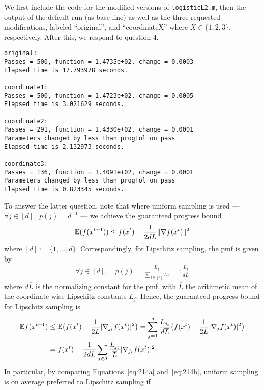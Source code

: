 \documentclass{article}
\begin{document}
We first include the code for the modified versions of \texttt{logisticL2.m},
then the output of the default run (as base-line) as well as the three
requested modifications, labeled ``original'', and ``coordinateX'' where
$X \in \{1,2,3\}$, respectively. After this, we respond to question 4.

\begin{verbatim}
original: 
Passes = 500, function = 1.4735e+02, change = 0.0003 
Elapsed time is 17.793978 seconds.

coordinate1: 
Passes = 500, function = 1.4723e+02, change = 0.0005 
Elapsed time is 3.021629 seconds.

coordinate2: 
Passes = 291, function = 1.4330e+02, change = 0.0001 
Parameters changed by less than progTol on pass 
Elapsed time is 2.132973 seconds.

coordinate3: 
Passes = 136, function = 1.4091e+02, change = 0.0001 
Parameters changed by less than progTol on pass 
Elapsed time is 0.823345 seconds.
\end{verbatim}
To answer the latter question, note that where uniform sampling is used ---
$\forall j \in [d], \,\, p(j) =
d^{-1}$ --- we achieve the guaranteed progress bound
\begin{align}
  \mathbb E (f(x^{t+1})) \leq f(x^t) - \frac{1}{2dL} \|\nabla f(x^t)\|^2 \label{eq:214a}
\end{align}
where $[d] := \{1, \ldots, d\}$. Correspondingly, for Lipschitz sampling, the
pmf is given by
\begin{align*}
\forall j \in [d],\quad p(j) = \frac{L_j}{\sum_{j \in [d]} L_j} =: \frac{L_j}{d \overline{L}}
\end{align*}
where $d\overline{L}$ is the normalizing constant for the pmf, with
$\overline{L}$ the arithmetic mean of the coordinate-wise Lipschitz constants
$L_j$. Hence, the guaranteed progress bound for Lipschitz sampling is
\begin{align}
  \E f(x^{t+1}) &\leq \E \big( f(x^t) - \frac{1}{2L} |\nabla_{j_t}
                  f(x^t)|^2\big) %
                  = \sum_{j=1}^d \frac{L_{j_t}}{d\overline{L}} \big( f(x^t) - \frac{1}{2L} |\nabla_j
                  f(x^t)|^2 \big) %
                  \nonumber
  \\
                &= f(x^t) - \frac{1}{2d L} \sum_{j\in d}
                  \frac{L_{j_t}}{\overline{L}} |\nabla_{j_t} f(x^t)|^2
                  \label{eq:214b}
\end{align}
In particular, by comparing Equations~\eqref{eq:214a} and~\eqref{eq:214b},
uniform sampling is on average preferred to Lipschitz sampling if
\end{document}
